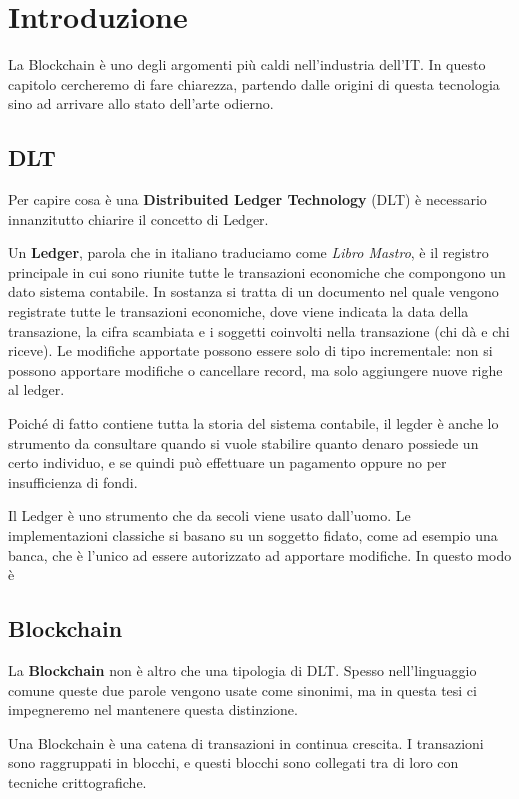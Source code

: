\chapter{Introduzione}

La Blockchain è uno degli argomenti più caldi nell'industria dell'IT. In questo
capitolo cercheremo di fare chiarezza, partendo dalle origini di questa tecnologia
sino ad arrivare allo stato dell'arte odierno.

\section{DLT}
Per capire cosa è una \textbf{Distribuited Ledger Technology} (DLT) è necessario
innanzitutto chiarire il concetto di Ledger.

Un \textbf{Ledger}, parola che in italiano traduciamo come \textit{Libro Mastro},
è il registro principale in cui sono riunite tutte le transazioni economiche
che compongono un dato sistema contabile. In sostanza si tratta di un documento
nel quale vengono registrate tutte le transazioni economiche, dove viene
indicata la data della transazione, la cifra scambiata e i soggetti coinvolti
nella transazione (chi dà e chi riceve). Le modifiche apportate possono essere solo
di tipo incrementale: non si possono apportare modifiche o cancellare record,
ma solo aggiungere nuove righe al ledger.

Poiché di fatto contiene tutta la storia del sistema contabile, il legder è anche
lo strumento da consultare quando si vuole stabilire quanto denaro possiede un certo
individuo, e se quindi può effettuare un pagamento oppure no per insufficienza
di fondi.

Il Ledger è uno strumento che da secoli viene usato dall'uomo. Le implementazioni
classiche si basano su un soggetto fidato, come ad esempio una banca, che è
l'unico ad essere autorizzato ad apportare modifiche. In questo modo è




\section{Blockchain}
La \textbf{Blockchain} non è altro che una tipologia di DLT. Spesso nell'linguaggio
comune queste due parole vengono usate come sinonimi, ma in questa tesi ci impegneremo
nel mantenere questa distinzione.

Una Blockchain è una catena di transazioni in continua crescita. I transazioni sono
raggruppati in blocchi, e questi blocchi sono collegati tra di loro con tecniche
crittografiche.

